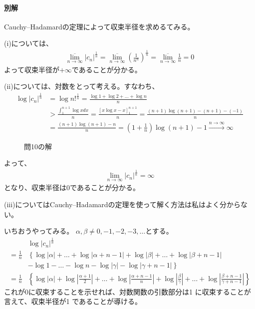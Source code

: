 \paragraph{別解}
Cauchy--Hadamardの定理によって収束半径を求めるてみる。

(i)については、
\begin{align*}
    \overline{\lim_{n\to\infty}}|c_n|^\frac{1}{n}=\overline{\lim_{n\to\infty}}\left(\frac{1}{n^n}\right)^\frac{1}{n}=\overline{\lim_{n\to\infty}}\frac{1}{n}=0
\end{align*}
よって収束半径が$+\infty$であることが分かる。

(ii)については、対数をとって考える。すなわち、
\begin{align*}
    \log |c_n|^\frac{1}{n}
   &=\log n!^\frac{1}{n}
   =\frac{\log 1 +\log 2 +\dots+\log n}{n}\\
   &>\frac{\int_{1}^{n+1}\log x dx}{n}
   =\frac{\left[x\log x -x\right]_1^{n+1}}{n}
   =\frac{(n+1)\log(n+1)-(n+1)-(-1)}{n}\\
   &=\frac{(n+1)\log(n+1)-n}{n}
   =\left(1+\frac{1}{n}\right)\log(n+1)-1
   \overset{n\longrightarrow\infty}{\longrightarrow}\infty
\end{align*}
\begin{figure}
    \centering
    \scalebox{0.6}{}
    \caption{問10の解}
\end{figure}
よって、
\begin{align*}
    \lim_{n\to\infty}|c_n|^\frac{1}{n}=\infty
\end{align*}
となり、収束半径は0であることが分かる。

(iii)についてはCauchy--Hadamardの定理を使って解く方法は私はよく分からない。

いちおうやってみる。
$\alpha, \beta\neq 0, -1,-2,-3,\dots$とする。
\begin{align*}
    &\log |c_n|^\frac{1}{n}\\
   =\frac{1}{n}
   &\left\{ 
   \log|\alpha|+\dots+\log|\alpha+n-1|
   +\log|\beta|+\dots+\log|\beta+n-1|\right.\\
   &\left.
   -\log 1-\dots-\log n 
   -\log|\gamma|-\log|\gamma+n-1| 
   \right\}\\
   =\frac{1}{n}&\left\{ \log|\alpha|+\log\left|\frac{\alpha+1}{2}\right|+\dots+\log\left|\frac{\alpha+n-1}{n}\right|
   +\log\left|\frac{\beta}{\gamma}\right|
   +\dots+\log\left|\frac{\beta+n-1}{\gamma+n-1}\right|\right\}
\end{align*}
これが0に収束することを示せれば、対数関数の引数部分は1
に収束することが言えて、収束半径が1
であることが導ける。

